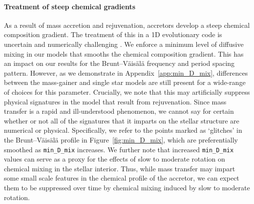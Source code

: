 \documentclass[twocolumn, twocolappendix, oneside]{aastex631}
\renewcommand{\bv}{Brunt–Väisälä\xspace}
\newcommand{\bvf}{Brunt–Väisälä frequency\xspace}
\begin{document}
\paragraph{Treatment of steep chemical gradients} As a result of mass accretion and rejuvenation, accretors develop a steep chemical composition gradient. The treatment of this in a 1D evolutionary code is uncertain and numerically challenging \citep[e.g.\ ][]{Lau+2014:2014A&A...570A.125L}. We enforce a minimum level of diffusive mixing in our models that smooths the chemical composition gradient. This has an impact on our results for the \bvf and period spacing pattern. However, as we demonstrate in Appendix~\ref{app:min_D_mix}, differences between the mass-gainer and single star models are still present for a wide-range of choices for this parameter. Crucially, we note that this may artificially suppress physical signatures in the model that result from rejuvenation. Since mass transfer is a rapid and ill-understood phenomenon, we cannot say for certain whether or not all of the signatures that it imparts on the stellar structure are numerical or physical. Specifically, we refer to the points marked as `glitches' in the \bv profile in Figure~\ref{fig:min_D_mix}, which are preferentially smoothed as \texttt{min\_D\_mix} increases. We further note that increased \texttt{min\_D\_mix} values can serve as a proxy for the effects of slow to moderate rotation on chemical mixing in the stellar interior. Thus, while mass transfer may impart some small scale features in the chemical profile of the accretor, we can expect them to be suppressed over time by chemical mixing induced by slow to moderate rotation.




\end{document}
